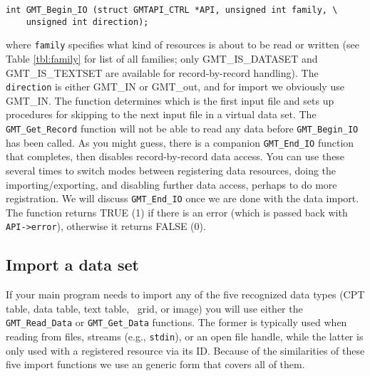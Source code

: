 \documentclass[11pt]{report}
\begin{document}
\begin{verbatim}
int GMT_Begin_IO (struct GMTAPI_CTRL *API, unsigned int family, \
    unsigned int direction);
\end{verbatim}
where \texttt{family} specifies what kind of resources is about to be read or written (see Table \ref{tbl:family}
for list of all families; only GMT\_IS\_DATASET and GMT\_IS\_TEXTSET are available for record-by-record handling).
The \texttt{direction} is either GMT\_IN or GMT\_out, and for import we obviously use GMT\_IN.
The function determines which is the first input file and sets up procedures for skipping to the next input file in a virtual data set.
The \texttt{GMT\_Get\_Record} function will not be able to read any data before \texttt{GMT\_Begin\_IO} has been called.  As you might
guess, there is a companion \texttt{GMT\_End\_IO} function that completes, then disables record-by-record data access.  You can use these several
times to switch modes between registering data resources, doing the importing/exporting, and disabling further
data access, perhaps to do more registration.  We will discuss \texttt{GMT\_End\_IO} once we are done with the data import.
The function returns TRUE (1) if there is an error (which is passed back with \texttt{API->error}),
otherwise it returns FALSE (0).

\subsection{Import a data set}

If your main program needs to import any of the five recognized data types (CPT table, data table, text table, \GMT\ grid, or image)
you will use either the \texttt{GMT\_Read\_Data} or \texttt{GMT\_Get\_Data} functions.  The former is typically used when
reading from files, streams (e.g., \texttt{stdin}), or an open file handle, while the latter is only used with a registered resource via
its ID.
Because of the similarities of these five import functions we use
an generic form that covers all of them.
\end{document}
